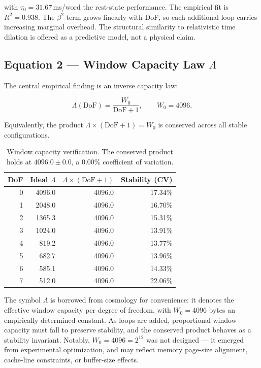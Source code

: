 with $\tau_0 = 31.67$\,ms/word the rest-state performance. The empirical fit is
$R^2 = 0.938$. The $\beta^2$ term grows linearly with DoF, so each additional
loop carries increasing marginal overhead. The structural similarity to
relativistic time dilation is offered as a predictive model, not a physical
claim.

\subsection{Equation 2 --- Window Capacity Law $\Lambda$}

The central empirical finding is an inverse capacity law:

\begin{equation}
\Lambda(\mathrm{DoF}) = \frac{W_0}{\mathrm{DoF} + 1},
\qquad W_0 = 4096.
\end{equation}

Equivalently, the product $\Lambda \times (\mathrm{DoF}+1) = W_0$ is conserved
across all stable configurations.

\begin{table}[ht]
\centering
\small
\begin{tabular}{rrrr}
\toprule
DoF & Ideal $\Lambda$ & $\Lambda \times (\mathrm{DoF}+1)$ & Stability (CV) \\
\midrule
0 & 4096.0 & 4096.0 & 17.34\% \\
1 & 2048.0 & 4096.0 & 16.70\% \\
2 & 1365.3 & 4096.0 & 15.31\% \\
3 & 1024.0 & 4096.0 & 13.91\% \\
4 & 819.2  & 4096.0 & 13.77\% \\
5 & 682.7  & 4096.0 & 13.96\% \\
6 & 585.1  & 4096.0 & 14.33\% \\
7 & 512.0  & 4096.0 & 22.06\% \\
\bottomrule
\end{tabular}
\caption{Window capacity verification. The conserved product holds at $4096.0 \pm 0.0$, a 0.00\% coefficient of variation.}
\end{table}

The symbol $\Lambda$ is borrowed from cosmology for convenience: it denotes the
effective window capacity per degree of freedom, with $W_0 = 4096$ bytes an
empirically determined constant. As loops are added, proportional window
capacity must fall to preserve stability, and the conserved product behaves as a
stability invariant. Notably, $W_0 = 4096 = 2^{12}$ was not designed --- it
emerged from experimental optimization, and may reflect memory page-size
alignment, cache-line constraints, or buffer-size effects.

